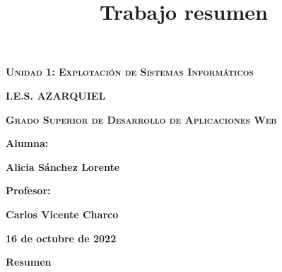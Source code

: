 \documentclass{book}
\title{Trabajo resumen}
\begin{document}
\frontmatter


\begin{titlepage}
\begin{center}

\vspace*{6\baselineskip} %

{\scshape\Huge \textbf{Unidad 1: Explotación de Sistemas Informáticos } \par}

\vspace{3cm}

{\bfseries\LARGE I.E.S. AZARQUIEL }

\vspace{1cm}

{\scshape\Large  \textbf{Grado Superior de Desarrollo de Aplicaciones Web}\par}


{\Large \textbf{Alumna:} \par}
{\Large   \textbf{Alicia Sánchez Lorente} \par}
{\Large  \textbf{Profesor:} \par}
{\Large  \textbf {Carlos Vicente Charco}\par}
\vfill
{\Large  \textbf{16 de octubre de 2022} \par}

\end{center}
\end{titlepage}
 
\shipout\null

\newpage

\begin{center}
    \textbf{\LARGE Resumen}
    \end{center}
\end{document}
